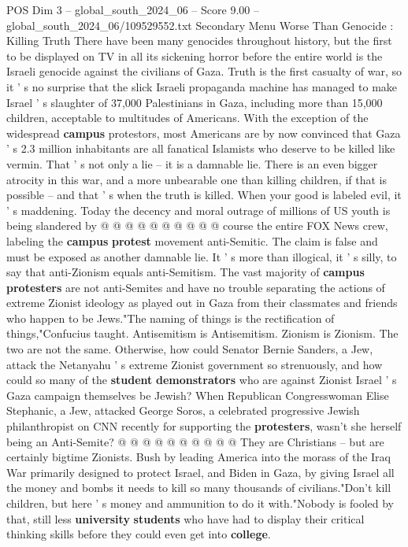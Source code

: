 \begin{textsample}{POS Dim 3 – global\_south\_2024\_06 – Score 9.00 – global\_south\_2024\_06/109529552.txt}  \label{ex:f3_pos_343}
Secondary Menu Worse Than Genocide : Killing Truth There have been many genocides throughout history, but the first to be displayed on TV in all its sickening horror before the entire world is the Israeli genocide against the civilians of Gaza.
Truth is the first casualty of war, so it ' s no surprise that the slick Israeli propaganda machine has managed to make Israel ' s slaughter of 37,000 Palestinians in Gaza, including more than 15,000 children, acceptable to multitudes of Americans.
With the exception of the widespread \textbf{campus} protestors, most Americans are by now convinced that Gaza ' s 2.3 million inhabitants are all fanatical Islamists who deserve to be killed like vermin.
That ' s not only a lie -- it is a damnable lie.
There is an even bigger atrocity in this war, and a more unbearable one than killing children, if that is possible -- and that ' s when the truth is killed.
When your good is labeled evil, it ' s maddening.
Today the decency and moral outrage of millions of US youth is being slandered by @ @ @ @ @ @ @ @ @ @ course the entire FOX News crew, labeling the \textbf{campus} \textbf{protest} movement anti-Semitic.
The claim is false and must be exposed as another damnable lie.
It ' s more than illogical, it ' s silly, to say that anti-Zionism equals anti-Semitism.
The vast majority of \textbf{campus} \textbf{protesters} are not anti-Semites and have no trouble separating the actions of extreme Zionist ideology as played out in Gaza from their classmates and friends who happen to be Jews."The naming of things is the rectification of things,"Confucius taught.
Antisemitism is Antisemitism.
Zionism is Zionism.
The two are not the same.
Otherwise, how could Senator Bernie Sanders, a Jew, attack the Netanyahu ' s extreme Zionist government so strenuously, and how could so many of the \textbf{student} \textbf{demonstrators} who are against Zionist Israel ' s Gaza campaign themselves be Jewish?
When Republican Congresswoman Elise Stephanic, a Jew, attacked George Soros, a celebrated progressive Jewish philanthropist on CNN recently for supporting the \textbf{protesters}, wasn't she herself being an Anti-Semite? @ @ @ @ @ @ @ @ @ @ They are Christians -- but are certainly bigtime Zionists.
Bush by leading America into the morass of the Iraq War primarily designed to protect Israel, and Biden in Gaza, by giving Israel all the money and bombs it needs to kill so many thousands of civilians."Don't kill children, but here ' s money and ammunition to do it with."Nobody is fooled by that, still less \textbf{university} \textbf{students} who have had to display their critical thinking skills before they could even get into \textbf{college}.

\end{textsample}
